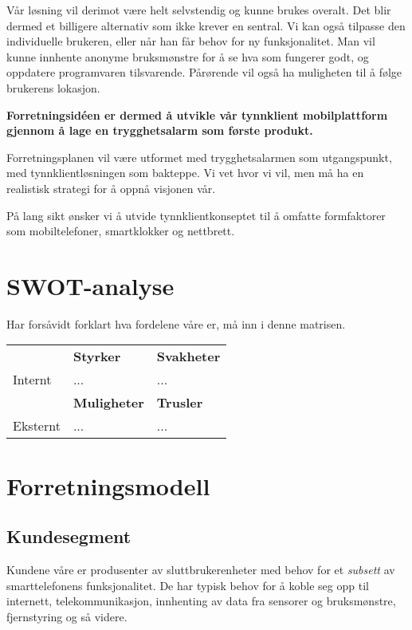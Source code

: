 Vår løsning vil derimot være helt selvstendig og kunne brukes overalt. Det blir
dermed et billigere alternativ som ikke krever en sentral. Vi kan også tilpasse
den individuelle brukeren, eller når han får behov for ny funksjonalitet. Man
vil kunne innhente anonyme bruksmønstre for å se hva som fungerer godt, og
oppdatere programvaren tilsvarende. Pårørende vil også ha muligheten til å
følge brukerens lokasjon.

\textbf{Forretningsidéen er dermed å utvikle vår tynnklient mobilplattform
gjennom å lage en trygghetsalarm som første produkt.}

Forretningsplanen vil være utformet med trygghetsalarmen som utgangspunkt, med
tynnklientløsningen som bakteppe. Vi vet hvor vi vil, men må ha en realistisk
strategi for å oppnå visjonen vår.

På lang sikt ønsker vi å utvide tynnklientkonseptet til å omfatte formfaktorer
som mobiltelefoner, smartklokker og nettbrett.

\section{SWOT-analyse}

Har forsåvidt forklart hva fordelene våre er, må inn i denne matrisen.

\begin{table}[h]
  \begin{tabular}{lll}
  & \textbf{Styrker}
  & \textbf{Svakheter} \\
  Internt
  & ...
  & ...
  \\
  & \textbf{Muligheter}
  & \textbf{Trusler} \\
  Eksternt
  & ...
  & ...
  \\
  \end{tabular}
\end{table}

\section{Forretningsmodell}

\subsection{Kundesegment}

Kundene våre er produsenter av sluttbrukerenheter med behov for et
\textit{subsett} av smarttelefonens funksjonalitet. De har typisk behov for å
koble seg opp til internett, telekommunikasjon, innhenting av data fra sensorer
og bruksmønstre, fjernstyring og så videre.

